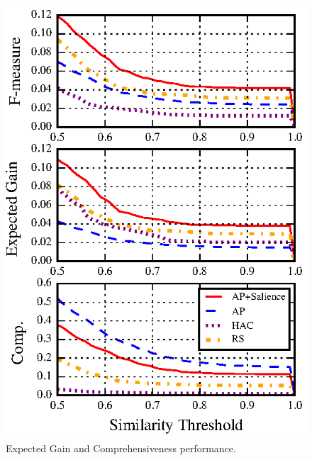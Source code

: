 \begin{figure}
 \center
 \includegraphics[scale=.6]{feature_based_salience_models/figures/nuggets-metrics2.eps}
 \caption{Expected Gain and Comprehensiveness performance.}
 \label{fig:3_aps_autots}
\end{figure}

